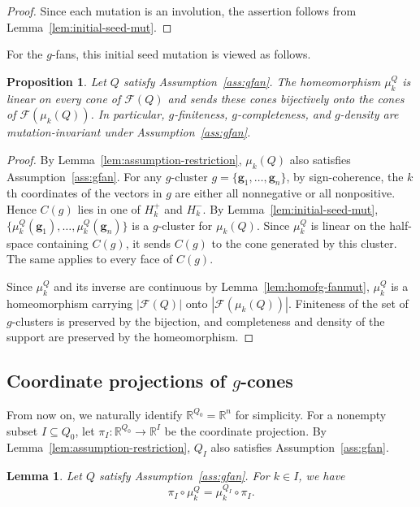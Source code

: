\documentclass[11pt,reqno]{amsart}
\numberwithin{equation}{section}
\theoremstyle{definition}
\theoremstyle{plain}
\newtheorem{lemma}[example]{Lemma}
\newtheorem{proposition}[example]{Proposition}
\begin{document}
  \begin{proof}
    Since each mutation is an involution, the assertion follows from Lemma~\ref{lem:initial-seed-mut}.
  \end{proof}

  For the $g$-fans, this initial seed mutation is viewed as follows.
	\begin{proposition}\label{prop:gfan-mut}
		Let $Q$ satisfy Assumption~\ref{ass:gfan}. The homeomorphism $\mu_k^Q$ is linear on every cone of $\mathcal F(Q)$ and sends these cones bijectively onto the cones of $\mathcal F(\mu_k(Q))$. In particular, $g$-finiteness, $g$-completeness, and $g$-density are mutation-invariant under Assumption~\ref{ass:gfan}.
	\end{proposition}
	
	\begin{proof}
		By Lemma~\ref{lem:assumption-restriction}, $\mu_k(Q)$ also satisfies Assumption~\ref{ass:gfan}. For any $g$-cluster $g = \{\mathbf{g}_1,\dots,\mathbf{g}_n\}$, by sign-coherence, the $k$th coordinates of the vectors in $g$ are either all nonnegative or all nonpositive. Hence $C(g)$ lies in one of $H_k^{+}$ and $H_k^{-}$. By Lemma~\ref{lem:initial-seed-mut}, $\{\mu_k^Q(\mathbf g_1),\ldots,\mu_k^Q(\mathbf g_n)\}$ is a $g$-cluster for $\mu_k(Q)$. Since $\mu_k^Q$ is linear on the half-space containing $C(g)$, it sends $C(g)$ to the cone generated by this cluster. The same applies to every face of $C(g)$.
		
		Since $\mu_k^Q$ and its inverse are continuous by Lemma~\ref{lem:homofg-fanmut}, $\mu_k^Q$ is a homeomorphism carrying $|\mathcal F(Q)|$ onto $|\mathcal F(\mu_k(Q))|$. Finiteness of the set of $g$-clusters is preserved by the bijection, and completeness and density of the support are preserved by the homeomorphism.
	\end{proof}
  
\subsection{Coordinate projections of \texorpdfstring{$g$}{g}-cones}
  From now on, we naturally identify $\mathbb{R}^{Q_0} = \mathbb{R}^n$ for simplicity. For a nonempty subset $I\subseteq Q_0$, let $\pi_I:\mathbb R^{Q_0}\to\mathbb R^I$ be the coordinate projection. By Lemma~\ref{lem:assumption-restriction}, $Q_I$ also satisfies Assumption~\ref{ass:gfan}.
	
	\begin{lemma}\label{lem:pi-commute}
		Let $Q$ satisfy Assumption~\ref{ass:gfan}. For $k\in I$, we have
		\[
		\pi_I\circ\mu_k^Q=\mu_k^{Q_I}\circ\pi_I.
		\]
	\end{lemma}
	
\end{document}
